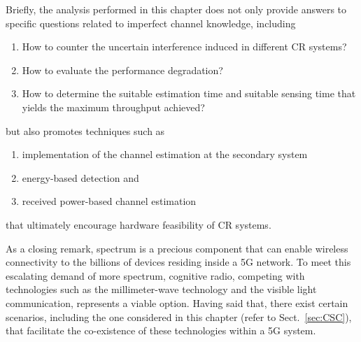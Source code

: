 {Briefly, the analysis performed in this chapter does not only provide answers to specific questions related to imperfect channel knowledge, including
\begin{enumerate} \item How to counter the uncertain interference induced in different CR systems? \item How to evaluate the performance degradation? \item How to determine the suitable estimation time and suitable sensing time that yields the maximum throughput achieved? \end{enumerate}
but also promotes techniques such as \begin{enumerate} \item implementation of the channel estimation at the secondary system \item energy-based detection and \item received power-based channel estimation \end{enumerate} that ultimately encourage hardware feasibility of CR systems.


As a closing remark, spectrum is a precious component that can enable wireless connectivity to the billions of devices residing inside a 5G network. To meet this escalating demand of more spectrum, cognitive radio, competing with technologies such as the millimeter-wave technology and the visible light communication, represents a viable option. Having said that, there exist certain scenarios, including the one considered in this chapter (refer to Sect.~\ref{sec:CSC}), that facilitate the co-existence of these technologies within a 5G system.


}
